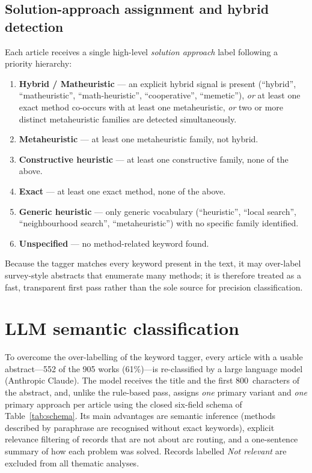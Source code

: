\documentclass[11pt]{article}
\begin{document}
\subsection{Solution-approach assignment and hybrid detection}

Each article receives a single high-level \emph{solution approach} label following a
priority hierarchy:

\begin{enumerate}[nosep]
  \item \textbf{Hybrid / Matheuristic} --- an explicit hybrid signal is present
        (``hybrid'', ``matheuristic'', ``math-heuristic'', ``cooperative'',
        ``memetic''), \emph{or} at least one exact method co-occurs with at least one
        metaheuristic, \emph{or} two or more distinct metaheuristic families are
        detected simultaneously.
  \item \textbf{Metaheuristic} --- at least one metaheuristic family, not hybrid.
  \item \textbf{Constructive heuristic} --- at least one constructive family, none of
        the above.
  \item \textbf{Exact} --- at least one exact method, none of the above.
  \item \textbf{Generic heuristic} --- only generic vocabulary (``heuristic'',
        ``local search'', ``neighbourhood search'', ``metaheuristic'') with no
        specific family identified.
  \item \textbf{Unspecified} --- no method-related keyword found.
\end{enumerate}

Because the tagger matches every keyword present in the text, it may over-label
survey-style abstracts that enumerate many methods; it is therefore treated as a
fast, transparent first pass rather than the sole source for precision
classification.

\section{LLM semantic classification}

To overcome the over-labelling of the keyword tagger, every article with a usable
abstract---552 of the 905 works (61\%)---is re-classified by a large language model
(Anthropic Claude). The model receives the title and the first 800~characters of the
abstract, and, unlike the rule-based pass, assigns \emph{one} primary variant and
\emph{one} primary approach per article using the closed six-field schema of
Table~\ref{tab:schema}. Its main advantages are semantic inference (methods described
by paraphrase are recognised without exact keywords), explicit relevance filtering of
records that are not about arc routing, and a one-sentence summary of how each
problem was solved. Records labelled \emph{Not relevant} are excluded from all
thematic analyses.
\end{document}
